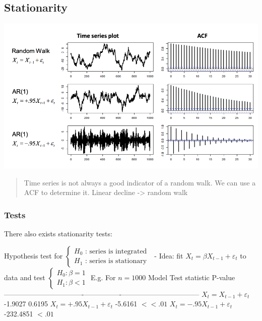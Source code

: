 \documentclass[
  oneside]{book}
\begin{document}
\hypertarget{stationarity}{%
\subsection{Stationarity}\label{stationarity}}

\includegraphics{Notes/Obsidian-Attachments/9-Statistical-Arbitrage-9.png}

\begin{quote}
Time series is not always a good indicator of a random walk. We can use a ACF to determine it. Linear decline -\textgreater{} random walk
\end{quote}

\hypertarget{tests}{%
\subsubsection{Tests}\label{tests}}

There also exists stationarity tests:

Hypothesis test for \(\left\{\begin{array}{l}H_0 \text { : series is integrated } \\ H_1 \text { : series is stationary }\end{array}\right.\)
- Idea: fit \(X_t=\beta X_{t-1}+\varepsilon_t\) to data and test \(\left\{\begin{array}{l}H_0: \beta=1 \\ H_1: \beta<1\end{array}\right.\) E.g. For \(n=1000\)
\textbar{} Model \textbar{} Test statistic \textbar{} P-value \textbar{}
\textbar----------------------------------\textbar----------------\textbar---------------------------------\textbar{}
\textbar{} \(X_t=X_{t-1}+\varepsilon_t\) \textbar{} -1.9027 \textbar{} 0.6195 \textbar{}
\textbar{} \(X_t=+.95 X_{t-1}+\varepsilon_t\) \textbar{} -5.6161 \textbar{} \(<<.01\) \textbar{}
\textbar{} \(X_t=-.95 X_{t-1}+\varepsilon_t\) \textbar{} -232.4851 \textbar{} \(<.01\) \textbar{}
\end{document}
